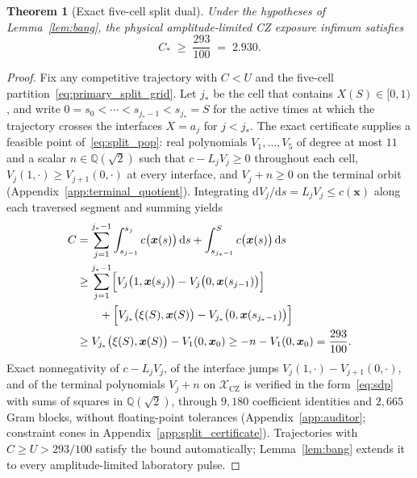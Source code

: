 \documentclass[aps,prx,reprint,nofootinbib,longbibliography,floatfix]{revtex4-2}
\newtheorem{theorem}{Theorem}
\theoremstyle{plain}
\theoremstyle{remark}
\newcommand{\dd}{\mathrm{d}}
\newcommand{\xv}{\boldsymbol{x}}
\begin{document}
\begin{theorem}[Exact five-cell split dual]
\label{thm:split_exact}
Under the hypotheses of Lemma~\ref{lem:bang}, the physical amplitude-limited CZ exposure infimum satisfies
\begin{equation}
C_* \;\ge\; \frac{293}{100} \;=\; 2.930.
\label{eq:split_bound}
\end{equation}
\end{theorem}
\begin{proof}
Fix any competitive trajectory with $C<U$ and the five-cell
partition~\eqref{eq:primary_split_grid}. Let $j_*$ be the cell that contains
$X(S)\in[0,1)$, and write $0=s_0<\cdots<s_{j_*-1}<s_{j_*}=S$ for the active times
at which the trajectory crosses the interfaces $X=a_j$ for $j<j_*$. The exact
certificate supplies a feasible point of~\eqref{eq:split_pop}: real polynomials
$V_1,\ldots,V_5$ of degree at most $11$ and a scalar $n\in\mathbb{Q}(\sqrt{2})$
such that $c-L_jV_j\ge0$ throughout each cell, $V_j(1,\cdot)\ge V_{j+1}(0,\cdot)$
at every interface, and $V_j+n\ge0$ on the terminal orbit
(Appendix~\ref{app:terminal_quotient}). Integrating $\dd V_j/\dd s=L_jV_j\le c(\xv)$
along each traversed segment and summing yields
\begin{equation}
\begin{aligned}
C
&=\sum_{j=1}^{j_*-1}\int_{s_{j-1}}^{s_j}c\bigl(\xv(s)\bigr)\,\dd s
+\int_{s_{j_*-1}}^{S}c\bigl(\xv(s)\bigr)\,\dd s\\
&\ge\sum_{j=1}^{j_*-1}\Bigl[V_j\bigl(1,\xv(s_j)\bigr)-V_j\bigl(0,\xv(s_{j-1})\bigr)\Bigr]\\
&\qquad+\Bigl[V_{j_*}\bigl(\xi(S),\xv(S)\bigr)-V_{j_*}\bigl(0,\xv(s_{j_*-1})\bigr)\Bigr]\\
&\ge V_{j_*}\bigl(\xi(S),\xv(S)\bigr)-V_1(0,\xv_0)
\ge -n-V_1(0,\xv_0)
=\frac{293}{100}.
\end{aligned}
\label{eq:split_weak_duality}
\end{equation}
Exact nonnegativity of $c-L_jV_j$, of the interface jumps
$V_j(1,\cdot)-V_{j+1}(0,\cdot)$, and of the terminal polynomials $V_j+n$ on
$\mathcal{X}_{\mathrm{CZ}}$ is verified in the form~\eqref{eq:sdp}
with sums of squares in $\mathbb{Q}(\sqrt{2})$, through $9{,}180$ coefficient
identities and $2{,}665$ Gram blocks, without floating-point tolerances
(Appendix~\ref{app:auditor}; constraint cones in
Appendix~\ref{app:split_certificate}). Trajectories with $C\ge U>293/100$ satisfy
the bound automatically; Lemma~\ref{lem:bang} extends it to every
amplitude-limited laboratory pulse.
\end{proof}
\end{document}
